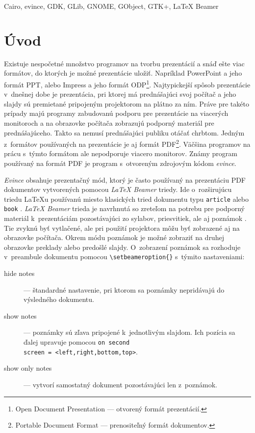 \documentclass[12pt,oneside,final]{fithesis2}
\begin{document}
\begin{ThesisKeyWords}
Cairo, evince, GDK, GLib, GNOME, GObject, GTK+, LaTeX Beamer
\end{ThesisKeyWords}
 
\MainMatter
\sloppy
\setcounter{tocdepth}{3}
\tableofcontents 
 
\chapter{Úvod}

Existuje nespočetné množstvo programov na tvorbu prezentácií a snáď ešte viac formátov, do ktorých je možné prezentácie uložiť. Napríklad PowerPoint a jeho formát PPT, alebo Impress a jeho formát ODP\footnote{Open Document Presentation --- otvorený formát prezentácií.}. Najtypickejší spôsob prezentácie v~dnešnej dobe je prezentácia, pri ktorej má prednášajúci svoj počítač a jeho slajdy sú premietané pripojeným projektorom na plátno za ním. Práve pre takéto prípady majú programy zabudovanú podporu pre prezentácie na viacerých monitoroch a na obrazovke počítača zobrazujú podporný materiál pre prednášajúceho. Takto sa nemusí prednášajúci publiku otáčať chrbtom. Jedným z~formátov používaných na prezentácie je aj formát PDF\footnote{Portable Document Format --- prenositeľný formát dokumentov.}. Väčšina programov na prácu s~týmto formátom ale nepodporuje viacero monitorov. Známy program používaný na formát PDF je program s~otvoreným zdrojovým kódom \emph{evince}.

\emph{Evince} obsahuje prezentačný mód, ktorý je často používaný na prezentáciu PDF dokumentov vytvorených pomocou \emph{LaTeX Beamer} triedy. Ide o~rozširujúcu triedu LaTeXu používanú miesto klasických tried dokumentu typu \texttt{article} alebo \texttt{book} \cite{abclatex}. \emph{LaTeX Beamer} trieda je navrhnutá so zreteľom na potrebu pre podporný materiál k~prezentáciám pozostávajúci zo sylabov, priesvitiek, ale aj poznámok \cite{beamer}. Tie zvyknú byť vytlačené, ale pri použití projektora môžu byť zobrazené aj na obrazovke počítača. Okrem módu poznámok je možné zobraziť na druhej obrazovke preklady alebo predošlé slajdy. O~zobrazení poznámok sa rozhoduje v~preambule dokumentu pomocou \verb|\setbeameroption{}| s~týmito nastaveniami:
\begin{description}
\item[hide notes] --- štandardné nastavenie, pri ktorom sa poznámky nepridávajú do výsledného dokumentu.
\item[show notes] --- poznámky sú zľava pripojené k~jednotlivým slajdom. Ich pozícia sa ďalej upravuje pomocou \texttt{on second \\ screen = <left,right,bottom,top>}.
\item[show only notes]  --- vytvorí samostatný dokument pozostávajúci len z~poznámok.
\end{description}
\end{document}
